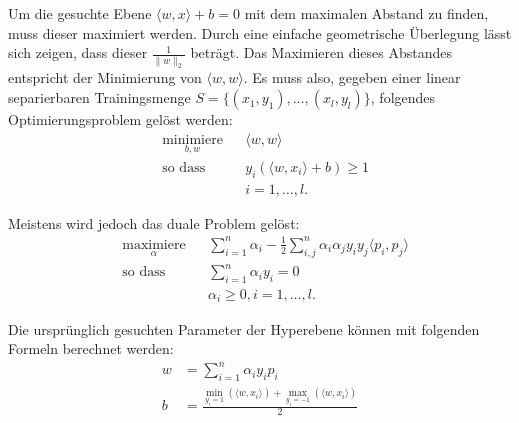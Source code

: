 \documentclass[ngerman]{scrartcl}
\begin{document}
Um die gesuchte Ebene $\langle w,x \rangle + b = 0$ mit dem maximalen Abstand zu finden, muss dieser maximiert werden.
Durch eine einfache geometrische Überlegung lässt sich zeigen, dass dieser $\frac{1}{\|w\|_2}$ beträgt. Das Maximieren dieses Abstandes entspricht der Minimierung von $\langle w,w \rangle$.
Es muss also, gegeben einer linear separierbaren Trainingsmenge $S = \lbrace(x_1, y_1),\ldots ,(x_l, y_l)\rbrace$, folgendes Optimierungsproblem gelöst werden:
\begin{align}
& \underset{b,w}{\text{minimiere}}& & \langle w,w \rangle \\
& \text{so dass } & & y_i \left( \langle w , x_i \rangle + b \right) \geq 1 \nonumber \\
& & &i = 1, \ldots, l. \nonumber
\end{align}

Meistens wird jedoch das duale Problem gelöst:
\begin{align}
&\underset{\alpha}{\text{maximiere}} && \sum_{i=1}^n \alpha_i - \frac{1}{2} \sum_{i,j}^n \alpha_i \alpha_j y_i y_j \langle p_i, p_j \rangle  \\
&\text{so dass } && \sum_{i=1}^n \alpha_i y_i = 0 \\
&&&  \alpha_i \geq 0, i = 1, \ldots  ,l.
\end{align}

Die ursprünglich gesuchten Parameter der Hyperebene können mit folgenden Formeln berechnet werden:
\begin{align}
w &= \sum_{i=1}^n \alpha_i y_i p_i \\
b &= \frac{\min_{y_i = 1}(\langle w,x_i \rangle ) + \max_{y_i = -1}(\langle w,x_i \rangle)}{2}
\end{align}
\end{document}
